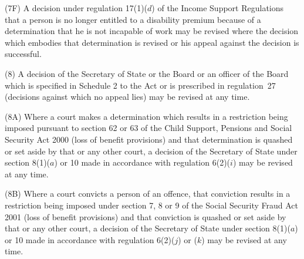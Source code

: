 \documentclass[12pt,a4paper]{article}
\begin{document}
(7F) A decision under regulation 17(1)($d$)  of the Income Support Regulations that a person is no longer entitled to a disability premium because of a determination that he is not incapable of work may be revised where the decision which embodies that determination is revised or his appeal against the decision is successful.

(8) A decision of the Secretary of State 
or the Board or an officer of the Board  %
which is specified in Schedule 2 to the Act or is prescribed in regulation~27 (decisions against which no appeal lies) may be revised at any time.

(8A) Where a court makes a determination which results in a restriction being imposed pursuant to section 62 or 63 of the Child Support, Pensions and Social Security Act 2000 (loss of benefit provisions) and that determination is quashed or set aside by that or any other court, a decision of the Secretary of State under section 8(1)($a$)  or 10 made in accordance with regulation 6(2)($i$) may be revised at any time.

(8B) Where a court convicts a person of an offence, that conviction results in a restriction being imposed under section 7, 8 or 9 of the Social Security Fraud Act 2001 (loss of benefit provisions) and that conviction is quashed or set aside by that or any other court, a decision of the Secretary of State under section 8(1)($a$)  or 10 made in accordance with regulation 6(2)($j$)  or ($k$)  may be revised at any time.

\end{document}
